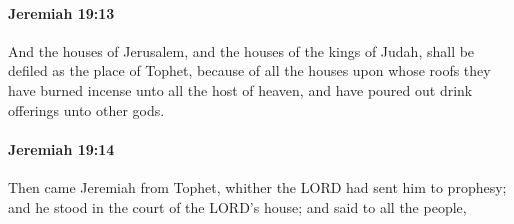 		\paragraph{Jeremiah 19:13} %
			\label{JEREMIAH-19-13}

			And the houses of Jerusalem, and the houses of the kings of Judah, shall be defiled as the place of Tophet, because of all the houses upon whose roofs they have burned incense unto all the host of heaven, and have poured out drink offerings unto other gods.


		\paragraph{Jeremiah 19:14} %
			\label{JEREMIAH-19-14}

			Then came Jeremiah from Tophet, whither the LORD had sent him to prophesy; and he stood in the court of the LORD’s house; and said to all the people,

